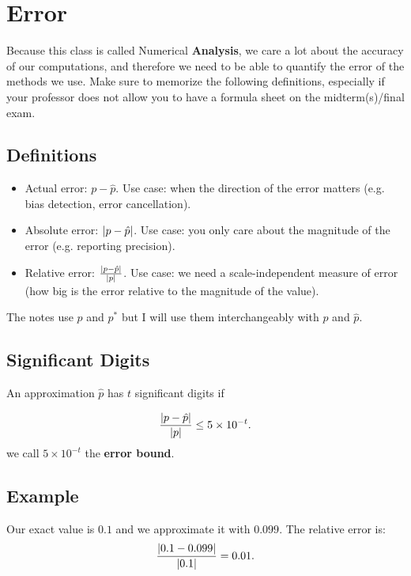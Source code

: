 \section{Error}

Because this class is called Numerical \textbf{Analysis}, we care a lot about
the accuracy of our computations, and therefore we need to be able to quantify
the error of the methods we use. Make sure to memorize the following
definitions, especially if your professor does not allow you to have a formula
sheet on the midterm(s)/final exam.

\subsection{Definitions}

\begin{minipage}{\textwidth}
  \begin{itemize}
    \item Actual error: $p - \hat{p}$. Use case: when the direction of the error
      matters (e.g. bias detection, error cancellation).
    \item Absolute error: $\abs{p - \hat{p}}$. Use case: you only care about the
      magnitude of the error (e.g. reporting precision).
    \item Relative error: $\frac{\abs{p - \hat{p}}}{\abs{p}}$. Use case: we need
      a scale-independent measure of error (\ie how big is the error relative to
      the magnitude of the value).
  \end{itemize}
  \small *The notes use $p$ and $p^*$ but I will use them interchangeably with
  $p$ and $\hat{p}$.
\end{minipage}

\subsection{Significant Digits}
An approximation $\hat p$ has $t$ significant digits if

\begin{equation*}
  \frac{\abs{p-\hat p}}{\abs{p}} \leq 5 \times 10^{-t}. 
\end{equation*}
we call $5\times 10^{-t}$ the \textbf{error bound}.

\subsection{Example}

Our exact value is $0.1$ and we approximate it with $0.099$. The relative error
is:
\[
  \frac{\abs{0.1 - 0.099}}{\abs{0.1}} = 0.01
.\]

